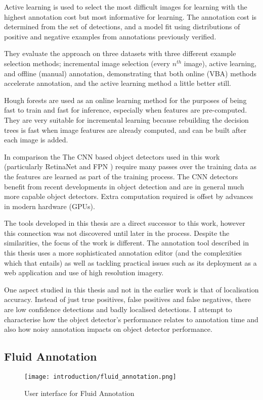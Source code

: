 Active learning is used to select the most difficult images for learning with the highest annotation cost but most informative for learning. The annotation cost is determined from the set of detections, and a model fit using distributions of positive and negative examples from annotations previously verified. 

They evaluate the approach on  three datasets with three different example selection methods; incremental image selection (every $n^{th}$ image), active learning, and offline (manual) annotation, demonstrating that both online (\gls{VBA}) methods accelerate annotation, and the active learning method a little better still.

Hough forests \cite{Gall2011} are used as an online learning method for the purposes of being fast to train and fast for inference, especially when features are pre-computed. They are very suitable for incremental learning because rebuilding the decision trees is fast when image features are already computed, and can be built after each image is added. 

In comparison the The \gls{CNN} based object detectors used in this work (particularly RetinaNet \cite{Lin2017} and \gls{FPN} \cite{Lin2017a}) require many passes over the training data as the features are learned as part of the training process. The \gls{CNN} detectors benefit from recent developments in object detection and are in general much more capable object detectors. Extra computation required is offset by advances in modern hardware (\gls{GPU}s).

The tools developed in this thesis are a direct successor to this work, however this connection was not discovered until later in the process. 
Despite the similarities, the focus of the work is different. The annotation tool described in this thesis uses a more sophisticated annotation editor (and the complexities which that entails) as well as tackling practical issues such as its deployment as a web application and use of high resolution imagery.

One aspect studied in this thesis and not in the earlier work is that of localisation accuracy. Instead of just true positives, false positives and false negatives, there are low confidence detections and badly localised detections. I attempt to characterise how the object detector's performance relates to annotation time and also how noisy annotation impacts on object detector performance.


\subsection{Fluid Annotation \cite{Andriluka2018}}
\begin{figure}[h]
  \centering
  \texttt{[image: introduction/fluid\_annotation.png]}
  \caption{User interface for Fluid Annotation \cite{Andriluka2018}}  
  \label{fig:fluid_annotation}
\end{figure}

